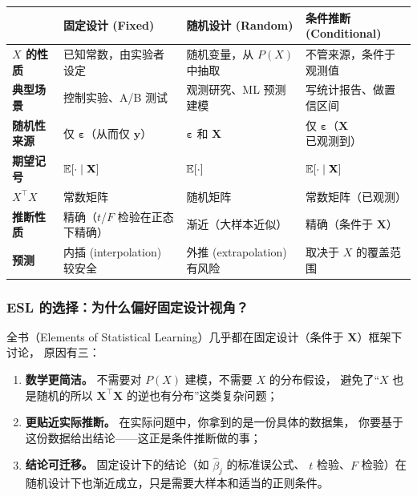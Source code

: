 \begin{center}
\renewcommand{\arraystretch}{1.5}
\begin{tabular}{p{2.5cm}|p{4.5cm}|p{4.5cm}|p{4.5cm}}
\toprule
& \textbf{固定设计 (Fixed)} & \textbf{随机设计 (Random)} & \textbf{条件推断 (Conditional)} \\
\midrule
\textbf{$X$ 的性质}
    & 已知常数，由实验者设定
    & 随机变量，从 $P(X)$ 中抽取
    & 不管来源，条件于观测值 \\
\midrule
\textbf{典型场景}
    & 控制实验、A/B 测试
    & 观测研究、ML 预测建模
    & 写统计报告、做置信区间 \\
\midrule
\textbf{随机性来源}
    & 仅 $\bm{\varepsilon}$（从而仅 $\mathbf{y}$）
    & $\bm{\varepsilon}$ 和 $\mathbf{X}$
    & 仅 $\bm{\varepsilon}$（$\mathbf{X}$ 已观测到） \\
\midrule
\textbf{期望记号}
    & $\mathbb{E}[\cdot \mid \mathbf{X}]$
    & $\mathbb{E}[\cdot]$
    & $\mathbb{E}[\cdot \mid \mathbf{X}]$ \\
\midrule
\textbf{$X^\top X$}
    & 常数矩阵
    & 随机矩阵
    & 常数矩阵（已观测） \\
\midrule
\textbf{推断性质}
    & 精确（$t$/$F$ 检验在正态下精确）
    & 渐近（大样本近似）
    & 精确（条件于 $\mathbf{X}$） \\
\midrule
\textbf{预测}
    & 内插 (interpolation) 较安全
    & 外推 (extrapolation) 有风险
    & 取决于 $X$ 的覆盖范围 \\
\bottomrule
\end{tabular}
\end{center}

\subsubsection{ESL 的选择：为什么偏好固定设计视角？}

全书（Elements of Statistical Learning）几乎都在固定设计（条件于 $\mathbf{X}$）框架下讨论，
原因有三：

\begin{enumerate}[label=(\arabic*)]
    \item \textbf{数学更简洁。} 不需要对 $P(X)$ 建模，不需要 $X$ 的分布假设，
    避免了``$X$ 也是随机的所以 $\mathbf{X}^\top \mathbf{X}$ 的逆也有分布''这类复杂问题；
    \item \textbf{更贴近实际推断。} 在实际问题中，你拿到的是一份具体的数据集，
    你要基于这份数据给出结论——这正是条件推断做的事；
    \item \textbf{结论可迁移。} 固定设计下的结论（如 $\hat{\beta}_j$ 的标准误公式、
    $t$ 检验、$F$ 检验）在随机设计下也渐近成立，只是需要大样本和适当的正则条件。
\end{enumerate}

